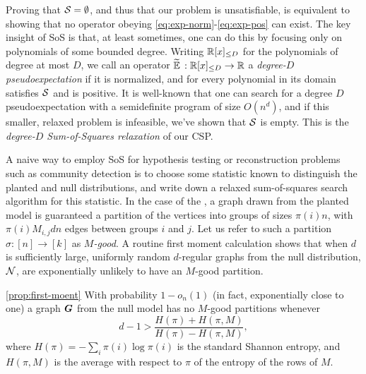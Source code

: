 Proving that $\mathcal{S} = \emptyset$, and thus that our problem is unsatisfiable, is equivalent to showing that no operator obeying \eqref{eq:exp-norm}-\eqref{eq:exp-pos} can exist. The key insight of SoS is that, at least sometimes, one can do this by focusing only on polynomials of some bounded degree. Writing $\mathbb{R}[x]_{\le D}$ for the polynomials of degree at most $D$, we call an operator $\widetilde{\operatorname*{\mathbb{E}}}\, : \mathbb{R}[x]_{\le D} \to \mathbb{R}$ a \emph{degree-$D$ pseudoexpectation} if it is normalized, and for every polynomial in its domain satisfies $\mathcal{S}$ and is positive. It is well-known that one can search for a degree $D$ pseudoexpectation with a semidefinite program of size $O(n^d)$, and if this smaller, relaxed problem is infeasible, we've shown that $\mathcal{S}$ is empty. This is the \emph{degree-$D$ Sum-of-Squares relaxation} of our CSP.

A naive way to employ SoS for hypothesis testing or reconstruction problems such as community detection is to choose some statistic known to distinguish the planted and null distributions, and write down a relaxed sum-of-squares search algorithm for this statistic. In the case of the \model, a graph drawn from the planted model is guaranteed a partition of the vertices into groups of sizes $\pi(i)n$, with $\pi(i)M_{i,j}dn$ edges between groups $i$ and $j$. Let us refer to such a partition $\sigma : [n] \to [k]$ as \emph{$M$-good}. A routine first moment calculation shows that when $d$ is sufficiently large, uniformly random $d$-regular graphs from the null distribution, $\mathcal{N}$, are exponentially unlikely to have an $M$-good partition.
%
\begin{proposition} \ref{prop:first-moent}
	With probability $1 - o_n(1)$ (in fact, exponentially close to one) a graph $\boldsymbol{G}$ from the null model has no $M$-good partitions whenever
	\begin{equation}
	    d-1 > \frac{H(\pi) + H(\pi,M)}{H(\pi) - H(\pi,M)},
	\end{equation}
	where $H(\pi) = -\sum_i\pi(i)\log\pi(i)$ is the standard Shannon entropy, and $H(\pi,M)$ is the average with respect to $\pi$ of the entropy of the rows of $M$.
\end{proposition}

